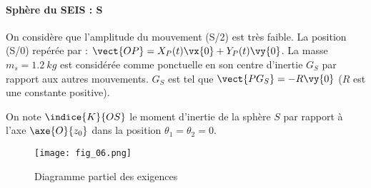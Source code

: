 \paragraph*{Sphère du SEIS : S}
On considère que l’amplitude du mouvement (S/2) est très faible. La position (S/0) repérée par : $\vect{OP}= X_P(t) \vx{0} + Y_P(t) \vy{0} $. La masse $m_s = \SI{1,2}{kg}$ est considérée comme ponctuelle en son centre d’inertie $G_S$  par rapport aux autres mouvements. $G_S$  est tel que $\vect{PG_S} = -R \vy{0}$ ($R$ est une constante positive).

On note $\indice{K}{OS}$ le moment d'inertie de la sphère $S$ par rapport à l’axe $\axe{O}{z_0}$  dans la position $\theta_1 =\theta_2 = 0$.


\begin{figure}[!h]
\centering
\texttt{[image: fig\_06.png]}
\caption{Diagramme partiel des exigences \label{fig_06}}
\end{figure}


\vfill
